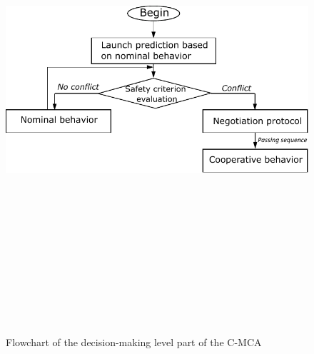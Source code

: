         \begin{figure}[!h]
        \centering 
        \includegraphics[width=12cm,height=18cm,keepaspectratio]{chapters/Chapitre_4/Figures/Decision-making-level.pdf}
        \caption{Flowchart of the decision-making level part of the C-MCA}
        \label{fig:Decision-module}
        \end{figure}




